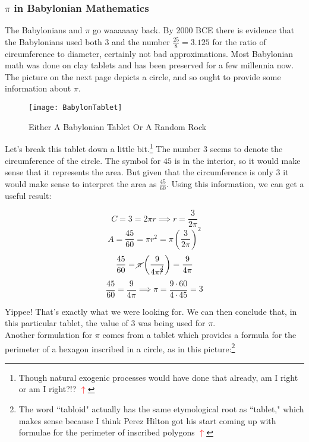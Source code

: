 \documentclass[11pt,titlepage]{article}
\begin{document}
\subsubsection*{$\pi$ in Babylonian Mathematics}
\label{babylonpi}


The Babylonians and $\pi$ go waaaaaay back. By 2000 BCE there is evidence that the Babylonians used both $3$ and the number $\frac{25}{8} = 3.125$ for the ratio of circumference to diameter, certainly not bad approximations. Most Babylonian math was done on clay tablets and has been preserved for a few millennia now. The picture on the next page depicts a circle, and so ought to provide some information about $\pi$.

\begin{figure}
\centering
\texttt{[image: BabylonTablet]}
\caption{Either A Babylonian Tablet Or A Random Rock}
\end{figure}

Let's break this tablet down a little bit.\label{tablet}\footnote{Though natural exogenic processes would have done that already, am I right or am I right?!? \hyperref[tablet]{\textbf{\textcolor{red}{$\uparrow$}}}} The number $3$ seems to denote the circumference of the circle. The symbol for $45$ is in the interior, so it would make sense that it represents the area. But given that the circumference is only $3$ it would make sense to interpret the area as $\frac{45}{60}$. Using this information, we can get a useful result:

$$C = 3 = 2\pi r \implies r = \frac{3}{2\pi}$$
$$A = \frac{45}{60} = \pi r^2 = \pi\left(\frac{3}{2\pi}\right)^2$$
$$\frac{45}{60} = \cancel{\pi}\left(\frac{9}{4\pi^{\cancel{2}}}\right) = \frac{9}{4\pi}$$
$$\frac{45}{60} = \frac{9}{4\pi} \implies \pi = \frac{9\cdot 60}{4\cdot 45} = 3$$

Yippee! That's exactly what we were looking for. We can then conclude that, in this particular tablet, the value of $3$ was being used for $\pi$. \\

Another formulation for $\pi$ comes from a tablet which provides a formula for the perimeter of a hexagon inscribed in a circle, as in this picture\label{tabloid}:\footnote{The word ``tabloid" actually has the same etymological root as ``tablet," which makes sense because I think Perez Hilton got his start coming up with formulae for the perimeter of inscribed polygons \hyperref[tabloid]{\textbf{\textcolor{red}{$\uparrow$}}}}
\end{document}
